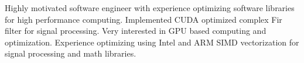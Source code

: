 

\begin{cvparagraph}

Highly motivated software engineer with experience optimizing software libraries for high performance computing.  Implemented CUDA optimized complex Fir filter for signal processing.  Very interested in GPU based computing and optimization.  Experience optimizing using Intel and ARM SIMD vectorization for signal processing and math libraries.
\end{cvparagraph}
